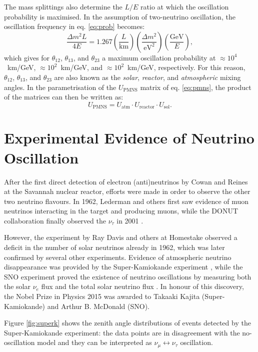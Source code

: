 The mass splittings also determine the $L/E$ ratio at which the oscillation probability is maximised. In the assumption of two-neutrino oscillation, the oscillation frequency in eq. \eqref{eq:prob} becomes:
\begin{equation}
     \frac{\Delta m^{2}L}{4E} = 1.267\left(\frac{L}{\mathrm{km}}\right)\left(\frac{\Delta m^2}{\mathrm{eV}^2}\right)\left(\frac{\mathrm{GeV}}{E}\right),
\end{equation} 
which gives for $\theta_{12}$, $\theta_{13}$, and $\theta_{23}$ a maximum oscillation probability at $\approx 10^4$~km/GeV, $\approx 10^2$~km/GeV, and $\approx 10^2$~km/GeV, respectively. For this reason, $\theta_{12}$, $\theta_{13}$, and $\theta_{23}$ are also known as the \emph{solar}, \emph{reactor}, and \emph{atmospheric} mixing angles. In the parametrisation of the $U_{\mathrm{PMNS}}$ matrix of eq. \eqref{eq:pmns}, the product of the matrices can then be written as:
\begin{equation}
    U_{\mathrm{PMNS}} = U_{\mathrm{atm}} \cdot U_{\mathrm{reactor}} \cdot U_{\mathrm{sol}}.
\end{equation}



\section{Experimental Evidence of Neutrino Oscillation}
After the first direct detection of electron (anti)neutrinos by Cowan and Reines at the Savannah nuclear reactor, efforts were made in order to observe the other two neutrino flavours.
In 1962, Lederman and others \cite{PhysRevLett.9.36} first saw evidence of muon neutrinos interacting in the target and producing muons, while the DONUT collaboration finally observed the $\nu_{\tau}$ in 2001 \cite{Kodama:2000mp}.

However, the experiment by Ray Davis and others at Homestake observed a deficit in the number of solar neutrinos already in 1962, which was later confirmed by several other experiments. Evidence of atmospheric neutrino disappearance was provided by the Super-Kamiokande experiment \cite{Fukuda:1998mi}, while the SNO experiment proved the existence of neutrino oscillations by measuring both the solar $\nu_{e}$ flux and the total solar neutrino flux \cite{Ahmad:2002jz}. In honour of this discovery, the Nobel Prize in Physics 2015 was awarded to Takaaki Kajita (Super-Kamiokande) and Arthur B. McDonald (SNO). 

Figure \ref{fig:superk} shows the zenith angle distributions of events detected by the Super-Kamiokande experiment: the data points are in disagreement with the no-oscillation model and they can be interpreted as $\nu_{\mu} \leftrightarrow \nu_{\tau}$ oscillation.

